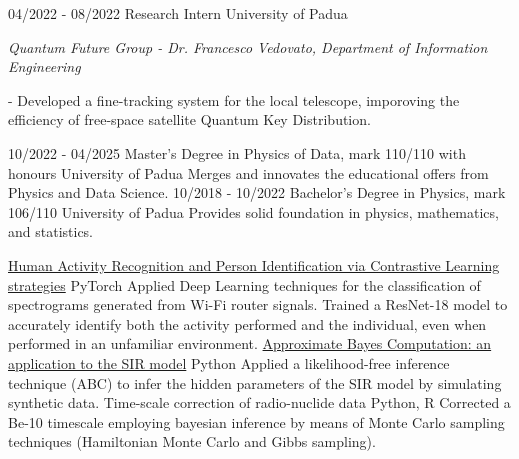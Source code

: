 \documentclass[9pt]{developercv} %
\begin{document}
\begin{entrylist}
	\entry
        {04/2022 - 08/2022}
		{ Research Intern}
		{University of Padua}
            {\textit{Quantum Future Group - Dr. Francesco Vedovato, Department of Information Engineering}

            - Developed a fine-tracking system for the local telescope, imporoving the efficiency of free-space satellite Quantum Key Distribution.
            }
\end{entrylist}

\vspace{-10 pt}
\begin{entrylist}
    \entry
		{10/2022 - 04/2025}
		{Master's Degree in Physics of Data, \small{mark 110/110 with honours} }
		{University of Padua}
		{Merges and innovates the educational offers from Physics and Data Science.}
    \entry
		{10/2018 - 10/2022}
		{Bachelor's Degree in Physics, \small{mark 106/110}}
		{University of Padua}
		{Provides solid foundation in physics, mathematics, and statistics.}

\end{entrylist}


\begin{entrylist}
    \entry
        {}
        {\href{https://github.com/giovanni-merlin/NNDL-HAR-project}{Human Activity Recognition and Person Identification via Contrastive Learning strategies}}
        {PyTorch}
		{Applied Deep Learning techniques for the classification of spectrograms generated from Wi-Fi router signals. Trained a ResNet-18 model to accurately identify both the activity performed and the individual, even when performed in an unfamiliar environment.}
    \entry
        {}
        {\href{https://github.com/diegobonato/approximate-bayes-sir}{Approximate Bayes Computation: an application to the SIR model}}
        {Python}
		{Applied a likelihood-free inference technique (ABC) to infer the hidden parameters of the SIR model by simulating synthetic data.}
    \entry
        {}
        {Time-scale correction of radio-nuclide data}
        {Python, R}
		{Corrected a Be-10 timescale employing bayesian inference by means of Monte Carlo sampling techniques (Hamiltonian Monte Carlo and Gibbs sampling).}


\end{entrylist}
\end{document}
